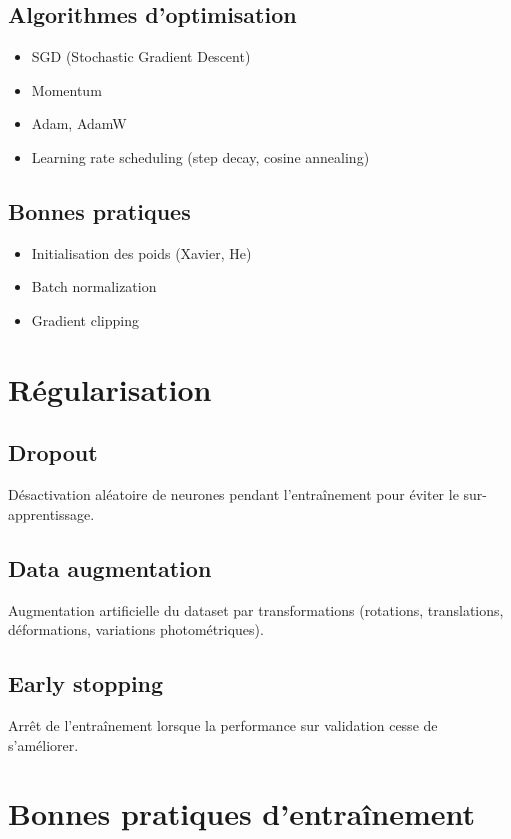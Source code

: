 \subsection{Algorithmes d'optimisation}
\begin{itemize}
    \item SGD (Stochastic Gradient Descent)
    \item Momentum
    \item Adam, AdamW
    \item Learning rate scheduling (step decay, cosine annealing)
\end{itemize}

\subsection{Bonnes pratiques}
\begin{itemize}
    \item Initialisation des poids (Xavier, He)
    \item Batch normalization
    \item Gradient clipping
\end{itemize}

\section{Régularisation}

\subsection{Dropout}
Désactivation aléatoire de neurones pendant l'entraînement pour éviter le sur-apprentissage.

\subsection{Data augmentation}
Augmentation artificielle du dataset par transformations (rotations, translations, déformations, variations photométriques).

\subsection{Early stopping}
Arrêt de l'entraînement lorsque la performance sur validation cesse de s'améliorer.

\section{Bonnes pratiques d'entraînement}

